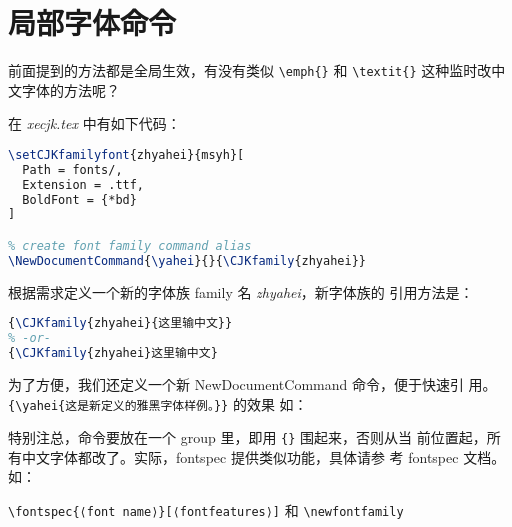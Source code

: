 \section{局部字体命令}

前面提到的方法都是全局生效，有没有类似 \verb|\emph{}| 和
\verb|\textit{}| 这种监时改中文字体的方法呢？

在 \textit{xecjk.tex} 中有如下代码：

\begin{lstlisting}[language=TeX,caption={New font family},label={lst:new-font-family}]
% set new font family
\setCJKfamilyfont{zhyahei}{msyh}[
  Path = fonts/,
  Extension = .ttf,
  BoldFont = {*bd}
]

% create font family command alias
\NewDocumentCommand{\yahei}{}{\CJKfamily{zhyahei}}
\end{lstlisting}

根据需求定义一个新的字体族 family 名 \textit{zhyahei}，新字体族的
引用方法是：

\begin{lstlisting}[language=TeX,caption={Inline Chinese fonts},label={lst:inline-chn-fonts}]
{\CJKfamily{zhyahei}{这里输中文}}
% -or-
{\CJKfamily{zhyahei}这里输中文}
\end{lstlisting}

为了方便，我们还定义一个新 NewDocumentCommand 命令，便于快速引
用。\verb|{\yahei{这是新定义的雅黑字体样例。}}| 的效果
如：{}

特别注总，命令要放在一个 group 里，即用 \verb|{}| 围起来，否则从当
前位置起，所有中文字体都改了。实际，fontspec 提供类似功能，具体请参
考 fontspec 文档。如：

\begin{center}
  \verb|\fontspec{⟨font name⟩}[⟨fontfeatures⟩]| 和 \verb|\newfontfamily|
\end{center}


